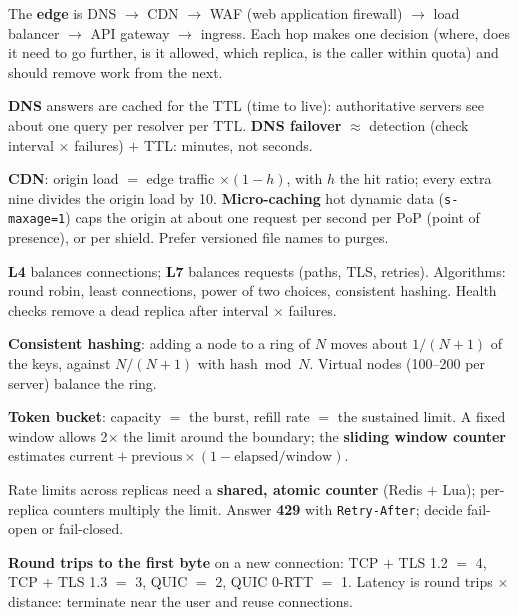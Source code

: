 \stages{\stEstimate\ \stDesign}

\begin{know}
  \item The \textbf{edge} is DNS $\to$ CDN $\to$ WAF (web application firewall) $\to$ load balancer $\to$ API gateway $\to$ ingress. Each hop makes one decision (where, does it need to go further, is it allowed, which replica, is the caller within quota) and should remove work from the next.
  \item \textbf{DNS} answers are cached for the TTL (time to live): authoritative servers see about one query per resolver per TTL. \textbf{DNS failover} $\approx$ detection (check interval $\times$ failures) $+$ TTL: minutes, not seconds.
  \item \textbf{CDN}: origin load $=$ edge traffic $\times (1 - h)$, with $h$ the hit ratio; every extra nine divides the origin load by 10. \textbf{Micro-caching} hot dynamic data (\texttt{s-maxage=1}) caps the origin at about one request per second per PoP (point of presence), or per shield. Prefer versioned file names to purges.
  \item \textbf{L4} balances connections; \textbf{L7} balances requests (paths, TLS, retries). Algorithms: round robin, least connections, power of two choices, consistent hashing. Health checks remove a dead replica after interval $\times$ failures.
  \item \textbf{Consistent hashing}: adding a node to a ring of $N$ moves about $1/(N+1)$ of the keys, against $N/(N+1)$ with $\text{hash} \bmod N$. Virtual nodes (100--200 per server) balance the ring.
  \item \textbf{Token bucket}: capacity $=$ the burst, refill rate $=$ the sustained limit. A fixed window allows 2$\times$ the limit around the boundary; the \textbf{sliding window counter} estimates $\text{current} + \text{previous} \times (1 - \text{elapsed}/\text{window})$.
  \item Rate limits across replicas need a \textbf{shared, atomic counter} (Redis $+$ Lua); per-replica counters multiply the limit. Answer \textbf{429} with \texttt{Retry-After}; decide fail-open or fail-closed.
  \item \textbf{Round trips to the first byte} on a new connection: TCP $+$ TLS 1.2 $=$ 4, TCP $+$ TLS 1.3 $=$ 3, QUIC $=$ 2, QUIC 0-RTT $=$ 1. Latency is round trips $\times$ distance: terminate near the user and reuse connections.
\end{know}

